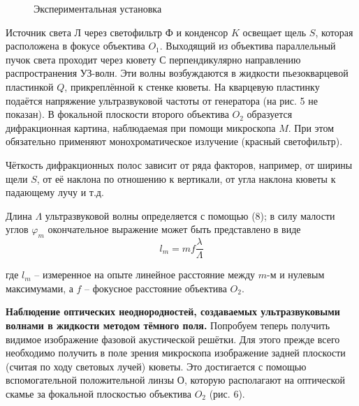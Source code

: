 \documentclass[14pt]{article}
\begin{document}
\begin{figure}[h!]
	\caption{Экспериментальная установка}
	\label{fig:image}
\end{figure}

Источник света Л через светофильтр Ф и конденсор $K$ освещает щель $S$, которая расположена в фокусе объектива $O_1$. Выходящий из объектива параллельный пучок света проходит через кювету С перпендикулярно направлению распространения УЗ-волн. Эти волны возбуждаются в жидкости пьезокварцевой пластинкой $Q$, прикреплённой к стенке кюветы. На кварцевую пластинку подаётся напряжение ультразвуковой частоты от генератора (на рис. 5 не показан). В фокальной плоскости второго объектива $O_2$ образуется дифракционная картина, наблюдаемая при помощи микроскопа $M$. При этом обязательно применяют монохроматическое излучение (красный светофильтр).

Чёткость дифракционных полос зависит от ряда факторов, например, от ширины щели $S$, от её наклона по отношению к вертикали, от угла наклона кюветы к падающему лучу и т.д.

Длина $\Lambda$ ультразвуковой волны определяется с помощью (8); в силу малости углов $\varphi_m$ окончательное выражение может быть представлено в виде
\begin{equation}
	l_m = mf\frac{\lambda}{\Lambda}
\end{equation}

где $l_m$ -- измеренное на опыте линейное расстояние между $m$-м и нулевым максимумами, а $f$ -- фокусное расстояние объектива $O_2$.

\textbf{Наблюдение оптических неоднородностей, создаваемых ультразвуковыми волнами в жидкости методом тёмного поля.} Попробуем теперь получить видимое изображение фазовой акустической решётки. Для этого прежде всего необходимо получить в поле зрения микроскопа изображение задней плоскости (считая по ходу световых лучей) кюветы. Это достигается с помощью вспомогательной положительной линзы О, которую располагают на оптической скамье за фокальной плоскостью объектива $O_2$ (рис. 6).
\end{document}
